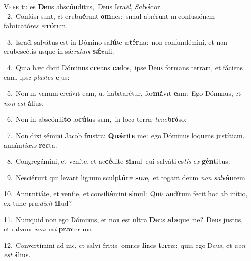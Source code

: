 \lettrine{\initial\textcolor{\initialcolor}{V}}{ere} tu es \textbf{De}\-us abs\-\textbf{cón}\-ditus,~\star Deus Isra\-\textit{ël}\-, \textit{Sal}\-\textbf{vá}tor.\\
{\numbfont\textcolor{\numbcolor}{~2.}}~Confúsi sunt, et erubu\-\textbf{é}\-runt \textbf{om}\-nes:~\star simul abiérunt in confusiónem fabricató\textit{res} \textit{er}\-\textbf{ró}rum.\par
{\numbfont\textcolor{\numbcolor}{~3.}}~Israël salvátus est in Dómino sa\-\textbf{lú}\-te æ\-\textbf{tér}\-na:~\star non confundémini, et non erubescétis usque in sǽ\-\textit{cu}\-\textit{lum} \textbf{sǽ}\-culi.\par
{\numbfont\textcolor{\numbcolor}{~4.}}~Quia hæc dicit Dóminus \textbf{cre}\-ans \textbf{cæ}\-los,~\star ipse Deus formans terram, et fáciens eam, ipse \textit{plas}\-\textit{tes} \textbf{e}\-jus:\par
{\numbfont\textcolor{\numbcolor}{~5.}}~Non in vanum creávit eam, ut habitarétur, for\-\textbf{má}\-vit \textbf{e}\-am:~\star Ego Dóminus, et \textit{non} \textit{est} \textbf{á}\-lius.\par
{\numbfont\textcolor{\numbcolor}{~6.}}~Non in abscóndi\textbf{to} lo\-\textbf{cú}\-tus sum,~\star in loco terræ \textit{te}\-\textit{ne}\textbf{bró}so:\par
{\numbfont\textcolor{\numbcolor}{~7.}}~Non dixi sémini Jacob frustra: \textbf{Quǽ}\-ri\textbf{te} me:~\star ego Dóminus loquens justítiam, annún\-\textit{ti}\-\textit{ans} \textbf{rec}\-ta.\par
{\numbfont\textcolor{\numbcolor}{~8.}}~Congregámini, et veníte, et ac\-\textbf{cé}\-dite \textbf{si}\-mul~\star qui salváti es\textit{tis} \textit{ex} \textbf{gén}\-tibus:\par
{\numbfont\textcolor{\numbcolor}{~9.}}~Nesciérunt qui levant lignum sculp\-\textbf{tú}\-ræ \textbf{su}\-æ,~\star et rogant deum \textit{non} \textit{sal}\-\textbf{ván}tem.\par
{\numbfont\textcolor{\numbcolor}{10.}}~Annuntiáte, et veníte, et consili\-\textbf{á}\-mini \textbf{si}\-mul:~\star Quis audítum fecit hoc ab inítio, ex tunc præ\-\textit{dí}\-\textit{xit} \textbf{il}\-lud?\par
{\numbfont\textcolor{\numbcolor}{11.}}~Numquid non ego Dóminus, et non est ultra \textbf{De}\-us \textbf{abs}\-que me?~\star Deus justus, et salvans \textit{non} \textit{est} \textbf{præ}\-ter me.\par
{\numbfont\textcolor{\numbcolor}{12.}}~Convertímini ad me, et salvi éritis, omnes \textbf{fi}\-nes \textbf{ter}\-ræ:~\star quia ego Deus, et \textit{non} \textit{est} \textbf{á}\-lius.\par
